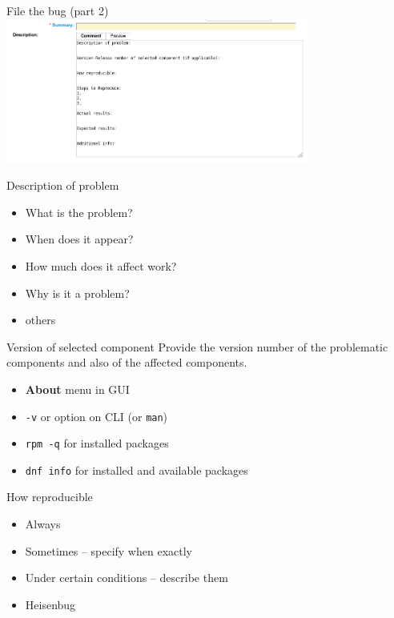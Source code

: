 \documentclass[12pt]{beamer}
\begin{document}
\begin{frame}{File the bug (part 2)}
\includegraphics[width=10cm]{images/bz_description.png}
\end{frame}

\begin{frame}{Description of problem}
\begin{itemize}
	\item What is the problem?
	\item When does it appear?
	\item How much does it affect work?
	\item Why is it a problem?
	\item others
\end{itemize}
\end{frame}

\begin{frame}[fragile]{Version of selected component}
Provide the version number of the problematic components and also of the affected components.
\begin{itemize}
	\item {\color{blue}\textbf{About}} menu in GUI
	\item {\color{blue}\texttt{-v}} or {\color{blue}{\verb|--version|}} option on CLI (or \texttt{man})
	\item {\color{blue}\texttt{rpm -q}} for installed packages
	\item {\color{blue}\texttt{dnf info}} for installed and available packages
\end{itemize}
\end{frame}

\begin{frame}{How reproducible}
\begin{itemize}
	\item Always
	\item Sometimes -- specify when exactly
	\item Under certain conditions -- describe them
	\item Heisenbug 
\end{itemize}
\end{frame}
\end{document}

